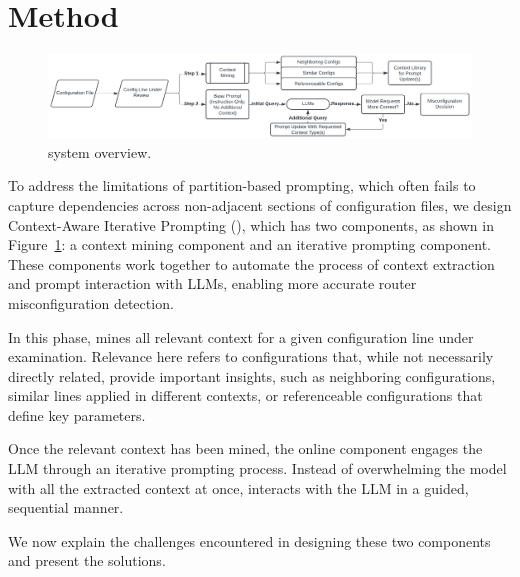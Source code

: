 \section{Method}
\label{sec:method}

\begin{figure}[t]
    \centering
    \includegraphics[width=\linewidth]{figs/caip_space.pdf}
    \caption{\sysname{} system overview.}
    \label{fig:overview}
\end{figure}


To address the limitations of partition-based prompting,
which often fails to capture dependencies across non-adjacent sections of configuration files,
we design
Context-Aware Iterative Prompting (\sysname{}), which has two components, as
shown in Figure~\ref{fig:overview}: a context mining component and an
iterative prompting component. These components work together to automate the
process of context extraction and prompt interaction with LLMs, enabling more
accurate router misconfiguration detection.


 In this phase, \sysname{} mines all
relevant context for a given configuration line under examination. Relevance
here refers to configurations that, while not necessarily directly related,
provide important insights, such as neighboring configurations, similar lines
applied in different contexts, or referenceable configurations that define key
parameters.


 Once the relevant context has been
mined, the online component engages the LLM through an iterative prompting
process. Instead of overwhelming the model with all the extracted context at
once, \sysname{} interacts with the LLM in a guided, sequential manner.



We now explain the challenges encountered in designing these two components and present the solutions.

